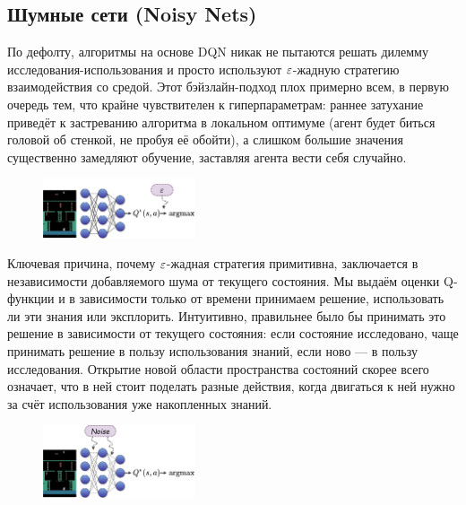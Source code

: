 \subsection{Шумные сети (Noisy Nets)}\label{subsec:noisynets}

По дефолту, алгоритмы на основе DQN никак не пытаются решать дилемму исследования-использования и просто используют $\varepsilon$-жадную стратегию взаимодействия со средой. Этот бэйзлайн-подход плох примерно всем, в первую очередь тем, что крайне чувствителен к гиперпараметрам: раннее затухание приведёт к застреванию алгоритма в локальном оптимуме (агент будет биться головой об стенкой, не пробуя её обойти), а слишком большие значения существенно замедляют обучение, заставляя агента вести себя случайно. 

\begin{figure}
\vspace{-0.3cm}
\centering
\includegraphics[width=0.4\textwidth]{Images/NoisyNets1.png}
\vspace{-0.3cm}
\end{figure}

Ключевая причина, почему $\varepsilon$-жадная стратегия примитивна, заключается в независимости добавляемого шума от текущего состояния. Мы выдаём оценки Q-функции и в зависимости только от времени принимаем решение, использовать ли эти знания или эксплорить. Интуитивно, правильнее было бы принимать это решение в зависимости от текущего состояния: если состояние исследовано, чаще принимать решение в пользу использования знаний, если ново --- в пользу исследования. Открытие новой области пространства состояний скорее всего означает, что в ней стоит поделать разные действия, когда двигаться к ней нужно за счёт использования уже накопленных знаний.

\begin{figure}
\vspace{-0.3cm}
\centering
\includegraphics[width=0.4\textwidth]{Images/NoisyNets2.png}
\vspace{-0.3cm}
\end{figure}

